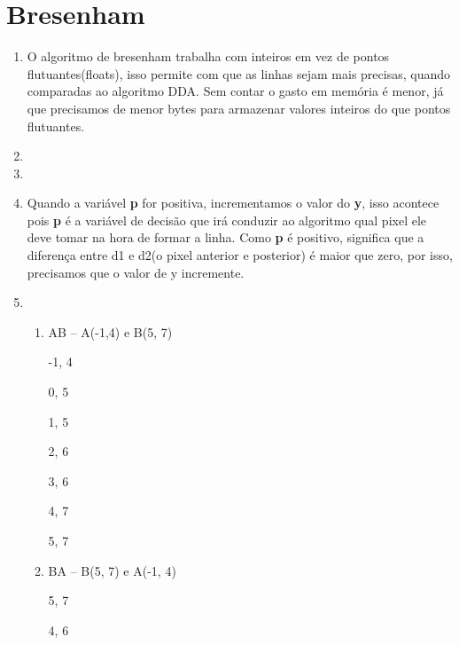 \section*{Bresenham}

	\begin{enumerate}\addtocounter{enumi}{10}
	
		\item O algoritmo de bresenham trabalha com inteiros em vez de pontos flutuantes(floats),
		isso permite com que as linhas sejam mais precisas, quando comparadas ao algoritmo DDA.
		Sem contar o gasto em memória é menor, já que precisamos de menor bytes para armazenar 	       valores inteiros do que pontos flutuantes.
		
		\item 

		\item 

		\item 
		Quando a variável \textbf{p} for positiva, incrementamos o valor do \textbf{y},
		isso acontece pois \textbf{p} é a variável de decisão que irá conduzir ao algoritmo
		qual pixel ele deve tomar na hora de formar a linha. Como \textbf{p} é positivo, 
		significa que a diferença entre d1 e d2(o pixel anterior e posterior) é maior que zero,
		por isso, precisamos que o valor de y incremente.

        \item \begin{enumerate}[label=\alph*.]
				   \setlength\itemsep{1em}
					\item	 AB – A(-1,4) e B(5, 7)
					   				
                       -1, 4
                       
                        0, 5
                        
                        1, 5
                        
                       2, 6
                       
                       3, 6
                       
                       4, 7
                       
                        5, 7
					
					\item    BA – B(5, 7) e A(-1, 4)
					
                           5, 7
                           
                          4, 6
                          

\end{enumerate}
\end{enumerate}
